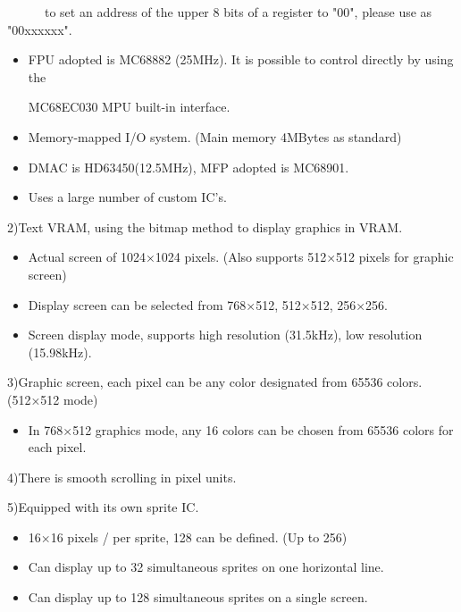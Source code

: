 ﻿\documentclass[twoside,a4paper,12pt]{article}
\begin{document}
\ \ \ \ \ \ to set an address of the upper 8 bits of a register to "00", please use as "00xxxxxx".

\begin{itemize}[leftmargin=30mm, itemsep=-1mm, topsep=1mm]
\item
FPU adopted is MC68882 (25MHz). It is possible to control directly by using the

MC68EC030 MPU built-in interface.
\item
Memory-mapped I/O system. (Main memory 4MBytes as standard)
\item
DMAC is HD63450(12.5MHz), MFP adopted is MC68901.
\item
Uses a large number of custom IC's.
\end{itemize}

2)Text VRAM, using the bitmap method to display graphics in VRAM.

\begin{itemize}[leftmargin=30mm, itemsep=-1mm, topsep=1mm]
\item
Actual screen of 1024×1024 pixels. (Also supports 512×512 pixels for graphic screen)
\item
Display screen can be selected from 768×512, 512×512, 256×256.
\item
Screen display mode, supports high resolution (31.5kHz), low resolution (15.98kHz).
\end{itemize}

3)Graphic screen, each pixel can be any color designated from 65536 colors. (512×512 mode)

\begin{itemize}[leftmargin=30mm, itemsep=-1mm, topsep=1mm]
\item
In 768×512 graphics mode, any 16 colors can be chosen from 65536 colors for each pixel.
\end{itemize}

4)There is smooth scrolling in pixel units.

5)Equipped with its own sprite IC.

\begin{itemize}[leftmargin=30mm, itemsep=-1mm, topsep=1mm]
\item
16×16 pixels / per sprite, 128 can be defined. (Up to 256)
\item
Can display up to 32 simultaneous sprites on one horizontal line.
\item
Can display up to 128 simultaneous sprites on a single screen.
\end{itemize}
\end{document}
